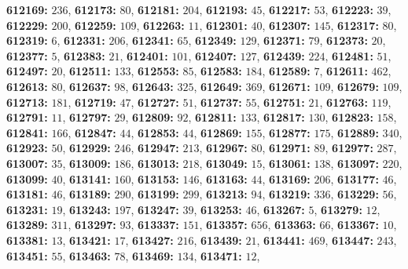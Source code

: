 \textsf{\bfseries 612169:} $236$, \textsf{\bfseries 612173:} $80$, \textsf{\bfseries 612181:} $204$, \textsf{\bfseries 612193:} $45$, \textsf{\bfseries 612217:} $53$, \textsf{\bfseries 612223:} $39$, \textsf{\bfseries 612229:} $200$, \textsf{\bfseries 612259:} $109$, \textsf{\bfseries 612263:} $11$, \textsf{\bfseries 612301:} $40$, \textsf{\bfseries 612307:} $145$, \textsf{\bfseries 612317:} $80$, \textsf{\bfseries 612319:} $6$, \textsf{\bfseries 612331:} $206$, \textsf{\bfseries 612341:} $65$, \textsf{\bfseries 612349:} $129$, \textsf{\bfseries 612371:} $79$, \textsf{\bfseries 612373:} $20$, \textsf{\bfseries 612377:} $5$, \textsf{\bfseries 612383:} $21$, \textsf{\bfseries 612401:} $101$, \textsf{\bfseries 612407:} $127$, \textsf{\bfseries 612439:} $224$, \textsf{\bfseries 612481:} $51$, \textsf{\bfseries 612497:} $20$, \textsf{\bfseries 612511:} $133$, \textsf{\bfseries 612553:} $85$, \textsf{\bfseries 612583:} $184$, \textsf{\bfseries 612589:} $7$, \textsf{\bfseries 612611:} $462$, \textsf{\bfseries 612613:} $80$, \textsf{\bfseries 612637:} $98$, \textsf{\bfseries 612643:} $325$, \textsf{\bfseries 612649:} $369$, \textsf{\bfseries 612671:} $109$, \textsf{\bfseries 612679:} $109$, \textsf{\bfseries 612713:} $181$, \textsf{\bfseries 612719:} $47$, \textsf{\bfseries 612727:} $51$, \textsf{\bfseries 612737:} $55$, \textsf{\bfseries 612751:} $21$, \textsf{\bfseries 612763:} $119$, \textsf{\bfseries 612791:} $11$, \textsf{\bfseries 612797:} $29$, \textsf{\bfseries 612809:} $92$, \textsf{\bfseries 612811:} $133$, \textsf{\bfseries 612817:} $130$, \textsf{\bfseries 612823:} $158$, \textsf{\bfseries 612841:} $166$, \textsf{\bfseries 612847:} $44$, \textsf{\bfseries 612853:} $44$, \textsf{\bfseries 612869:} $155$, \textsf{\bfseries 612877:} $175$, \textsf{\bfseries 612889:} $340$, \textsf{\bfseries 612923:} $50$, \textsf{\bfseries 612929:} $246$, \textsf{\bfseries 612947:} $213$, \textsf{\bfseries 612967:} $80$, \textsf{\bfseries 612971:} $89$, \textsf{\bfseries 612977:} $287$, \textsf{\bfseries 613007:} $35$, \textsf{\bfseries 613009:} $186$, \textsf{\bfseries 613013:} $218$, \textsf{\bfseries 613049:} $15$, \textsf{\bfseries 613061:} $138$, \textsf{\bfseries 613097:} $220$, \textsf{\bfseries 613099:} $40$, \textsf{\bfseries 613141:} $160$, \textsf{\bfseries 613153:} $146$, \textsf{\bfseries 613163:} $44$, \textsf{\bfseries 613169:} $206$, \textsf{\bfseries 613177:} $46$, \textsf{\bfseries 613181:} $46$, \textsf{\bfseries 613189:} $290$, \textsf{\bfseries 613199:} $299$, \textsf{\bfseries 613213:} $94$, \textsf{\bfseries 613219:} $336$, \textsf{\bfseries 613229:} $56$, \textsf{\bfseries 613231:} $19$, \textsf{\bfseries 613243:} $197$, \textsf{\bfseries 613247:} $39$, \textsf{\bfseries 613253:} $46$, \textsf{\bfseries 613267:} $5$, \textsf{\bfseries 613279:} $12$, \textsf{\bfseries 613289:} $311$, \textsf{\bfseries 613297:} $93$, \textsf{\bfseries 613337:} $151$, \textsf{\bfseries 613357:} $656$, \textsf{\bfseries 613363:} $66$, \textsf{\bfseries 613367:} $10$, \textsf{\bfseries 613381:} $13$, \textsf{\bfseries 613421:} $17$, \textsf{\bfseries 613427:} $216$, \textsf{\bfseries 613439:} $21$, \textsf{\bfseries 613441:} $469$, \textsf{\bfseries 613447:} $243$, \textsf{\bfseries 613451:} $55$, \textsf{\bfseries 613463:} $78$, \textsf{\bfseries 613469:} $134$, \textsf{\bfseries 613471:} $12$, 
